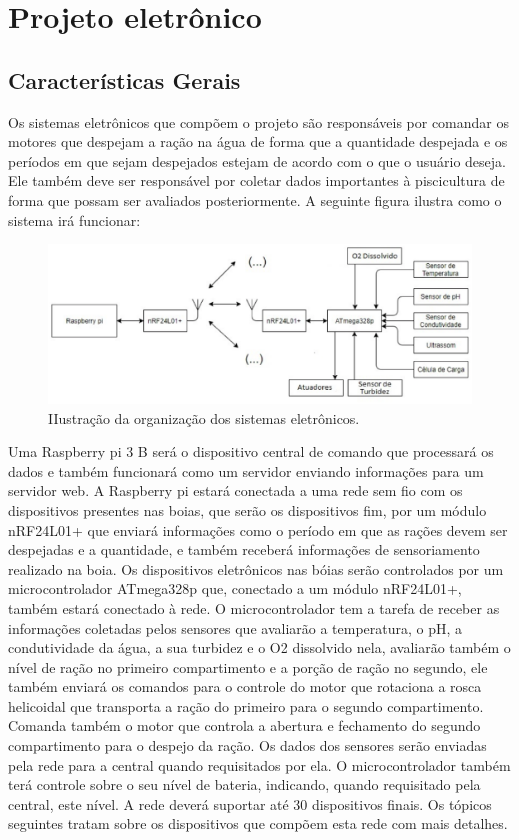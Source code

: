 \section{Projeto eletrônico}

\subsection{Características Gerais}

Os sistemas eletrônicos que compõem o projeto são responsáveis por comandar os motores que despejam a ração na água de forma que a quantidade despejada e os períodos em que sejam despejados estejam de acordo com o que o usuário deseja. Ele também deve ser responsável por coletar dados importantes à piscicultura de forma que possam ser avaliados posteriormente. A seguinte figura ilustra como o sistema irá funcionar:

\begin{figure}[H]
 \centering
   \includegraphics[keepaspectratio=true,scale=0.8]{figuras/componentes_eletronicos.eps}
 \caption{IIustração da organização dos sistemas eletrônicos.}
 \label{componentes}
\end{figure}

Uma Raspberry pi 3 B será o dispositivo central de comando que processará os dados e também funcionará como um servidor enviando informações para um servidor web. A Raspberry pi estará conectada a uma rede sem fio com os dispositivos presentes nas boias, que serão os dispositivos fim, por um módulo nRF24L01+ que enviará informações como o período em que as rações devem ser despejadas e a quantidade, e também receberá informações de sensoriamento realizado na boia. Os dispositivos eletrônicos nas bóias serão controlados por um microcontrolador ATmega328p que, conectado a um módulo nRF24L01+, também estará conectado à rede. O microcontrolador tem a  tarefa de receber as informações coletadas pelos sensores que avaliarão a temperatura, o pH, a condutividade da água, a sua turbidez e o O2 dissolvido nela, avaliarão também o nível de ração no primeiro compartimento e a porção de ração no segundo, ele também enviará os comandos para o controle do motor que rotaciona a rosca helicoidal que transporta a ração do primeiro para o segundo compartimento. Comanda também o motor que controla a abertura e fechamento do segundo compartimento para o despejo da ração. Os dados dos sensores serão enviadas pela rede para a central quando requisitados por ela. O microcontrolador também terá controle sobre o seu nível de bateria, indicando, quando requisitado pela central, este nível. A rede deverá suportar até 30 dispositivos finais. Os tópicos seguintes tratam sobre os dispositivos que compõem esta rede com mais detalhes.

